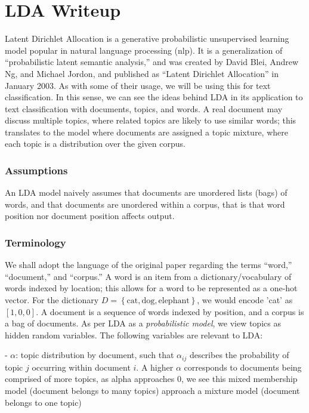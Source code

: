\documentclass[11pt, twoside, reqno]{book}
\begin{document}
\startmain
\chapter{LDA Writeup}

Latent Dirichlet Allocation is a generative probabilistic unsupervised learning model popular in natural language processing (nlp). It is a generalization of ``probabilistic latent semantic analysis,'' and was created by David Blei, Andrew Ng, and Michael Jordon, and published as ``Latent Dirichlet Allocation'' in January 2003. As with some of their usage, we will be using this for text classification. In this sense, we can see the ideas behind LDA in its application to text classification with documents, topics, and words. A real document may discuss multiple topics, where related topics are likely to use similar words; this translates to the model where documents are assigned a topic mixture, where each topic is a distribution over the given corpus.

\subsection{Assumptions}

An LDA model naively assumes that documents are unordered lists (bags) of words, and that documents are unordered within a corpus, that is that word position nor document position affects output.

\subsection{Terminology}

We shall adopt the language of the original paper regarding the terms ``word,'' ``document,'' and ``corpus.'' A word is an item from a dictionary/vocabulary of words indexed by location; this allows for a word to be represented as a one-hot vector. For the dictionary $D = \left\{ \text{cat}, \text{dog}, \text{elephant} \right\}$, we would encode 'cat' as $\left[ 1, 0, 0 \right]$. A document is a sequence of words indexed by position, and a corpus is a bag of documents. As per LDA as a \textit{probabilistic model}, we view topics as hidden random variables. The following variables are relevant to LDA:

- $\alpha$: topic distribution by document, such that $\alpha_{ij}$ describes the probability of topic $j$ occurring within document $i$. A higher $\alpha$ corresponds to documents being comprised of more topics, as alpha approaches 0, we see this mixed membership model (document belongs to many topics) approach a mixture model (document belongs to one topic)
\end{document}
